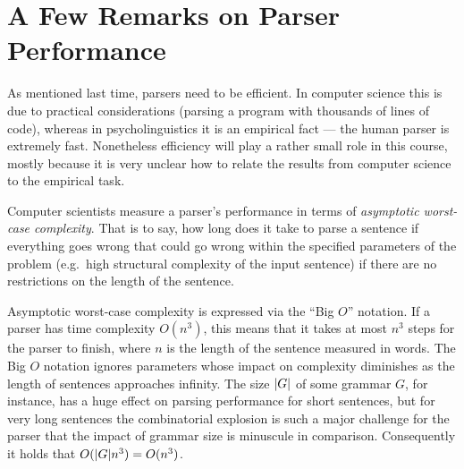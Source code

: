 \section{A Few Remarks on Parser Performance}
\label{sec:ParserOverview_Performance}

As mentioned last time, parsers need to be efficient.
In computer science this is due to practical considerations (parsing a program with thousands of lines of code), whereas in psycholinguistics it is an empirical fact --- the human parser is extremely fast.
Nonetheless efficiency will play a rather small role in this course, mostly because it is very unclear how to relate the results from computer science to the empirical task.

Computer scientists measure a parser's performance in terms of \emph{asymptotic worst-case complexity}.
That is to say, how long does it take to parse a sentence if everything goes wrong that could go wrong within the specified parameters of the problem (e.g.\ high structural complexity of the input sentence) if there are no restrictions on the length of the sentence.

Asymptotic worst-case complexity is expressed via the ``Big $O$'' notation.
If a parser has time complexity $O(n^3)$, this means that it takes at most $n^3$ steps for the parser to finish, where $n$ is the length of the sentence measured in words.
The Big $O$ notation ignores parameters whose impact on complexity diminishes as the length of sentences approaches infinity.
The size $| G |$ of some grammar $G$, for instance, has a huge effect on parsing performance for short sentences, but for very long sentences the combinatorial explosion is such a major challenge for the parser that the impact of grammar size is minuscule in comparison.
Consequently it holds that $O(| G | n^3) = O(n^3)$.

